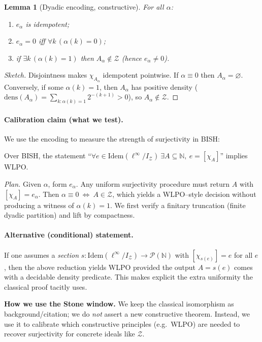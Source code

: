 \documentclass[11pt]{article}
\newtheorem{lemma}[theorem]{Lemma}
\theoremstyle{definition}
\theoremstyle{remark}
\begin{document}
\begin{lemma}[Dyadic encoding, constructive]
For all $\alpha$:
\begin{enumerate}
\item $e_\alpha$ is idempotent;
\item $e_\alpha=0$ iff $\forall k\,(\alpha(k)=0)$;
\item if $\exists k\,(\alpha(k)=1)$ then $A_\alpha\notin \mathcal Z$ (hence $e_\alpha\neq 0$).
\end{enumerate}
\end{lemma}
\begin{proof}[Sketch]
Disjointness makes $\chi_{A_\alpha}$ idempotent pointwise.
If $\alpha\equiv 0$ then $A_\alpha=\varnothing$.
Conversely, if some $\alpha(k)=1$, then $A_\alpha$ has positive density
($\mathrm{dens}(A_\alpha)=\sum_{k:\alpha(k)=1}2^{-(k+1)}>0$),
so $A_\alpha\notin\mathcal Z$.
\end{proof}

\paragraph{Calibration claim (what we test).}
We use the encoding to measure the strength of surjectivity in BISH:
\begin{conjecture}
\label{conj:surj-density-zero-WLPO}
Over BISH, the statement
``$\forall e\in \mathrm{Idem}(\ell^\infty/I_{\mathcal Z})\ \exists A\subseteq\mathbb N,\ e=[\chi_A]$''
implies WLPO.
\end{conjecture}
\emph{Plan.} Given $\alpha$, form $e_\alpha$.
Any uniform surjectivity procedure must return $A$ with $[\chi_A]=e_\alpha$.
Then $\alpha\equiv 0\ \Leftrightarrow\ A\in\mathcal Z$,
which yields a WLPO--style decision without producing a witness of $\alpha(k)=1$.
We first verify a finitary truncation (finite dyadic partition) and lift by compactness.

\paragraph{Alternative (conditional) statement.}
If one assumes a \emph{section} $s:\mathrm{Idem}(\ell^\infty/I_{\mathcal Z})\to\mathcal P(\mathbb N)$
with $[\chi_{s(e)}]=e$ for all $e$, then the above reduction yields WLPO provided the output $A=s(e)$
comes with a decidable density predicate.
This makes explicit the extra uniformity the classical proof tacitly uses.

\begin{mdframed}[style=status]
\textbf{How we use the Stone window.}
We keep the classical isomorphism as background/citation; we do \emph{not} assert a new constructive theorem.
Instead, we use it to calibrate which constructive principles (e.g.\ WLPO) are needed to recover surjectivity for concrete ideals like $\mathcal Z$.
\end{mdframed}
\end{document}
